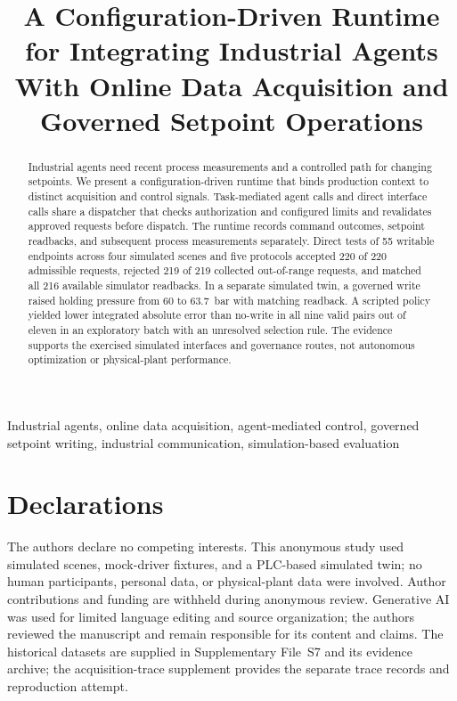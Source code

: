 \documentclass[journal]{IEEEtran}
\begin{document}

\title{A Configuration-Driven Runtime for Integrating Industrial Agents With Online Data Acquisition and Governed Setpoint Operations}

\author{}

\maketitle

\begin{abstract}
Industrial agents need recent process measurements and a controlled path for changing setpoints. We present a configuration-driven runtime that binds production context to distinct acquisition and control signals. Task-mediated agent calls and direct interface calls share a dispatcher that checks authorization and configured limits and revalidates approved requests before dispatch. The runtime records command outcomes, setpoint readbacks, and subsequent process measurements separately. Direct tests of 55 writable endpoints across four simulated scenes and five protocols accepted 220 of 220 admissible requests, rejected 219 of 219 collected out-of-range requests, and matched all 216 available simulator readbacks. In a separate simulated twin, a governed write raised holding pressure from 60 to 63.7~bar with matching readback. A scripted policy yielded lower integrated absolute error than no-write in all nine valid pairs out of eleven in an exploratory batch with an unresolved selection rule. The evidence supports the exercised simulated interfaces and governance routes, not autonomous optimization or physical-plant performance.
\end{abstract}

\begin{IEEEkeywords}
Industrial agents, online data acquisition, agent-mediated control, governed setpoint writing, industrial communication, simulation-based evaluation
\end{IEEEkeywords}

\IEEEpeerreviewmaketitle









\section*{Declarations}
The authors declare no competing interests. This anonymous study used simulated scenes, mock-driver fixtures, and a PLC-based simulated twin; no human participants, personal data, or physical-plant data were involved. Author contributions and funding are withheld during anonymous review. Generative AI was used for limited language editing and source organization; the authors reviewed the manuscript and remain responsible for its content and claims. The historical datasets are supplied in Supplementary File~S7 and its evidence archive; the acquisition-trace supplement provides the separate trace records and reproduction attempt.



\end{document}
